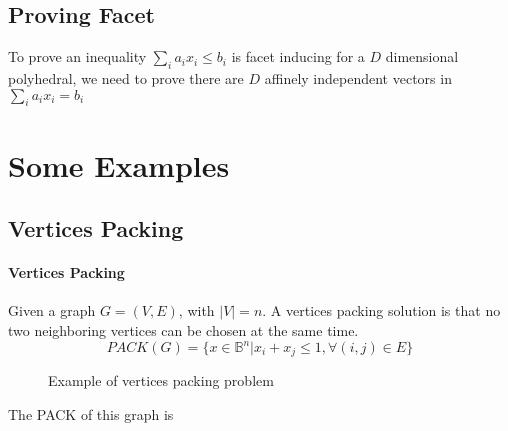             \subsection{Proving Facet}
                To prove an inequality $\sum_i a_i x_i \le b_i$ is facet inducing for a $D$ dimensional polyhedral, we need to prove there are $D$ affinely independent vectors in $\sum_i a_i x_i = b_i$

        \section{Some Examples}
            \subsection{Vertices Packing}
                \paragraph{Vertices Packing}
                    Given a graph $G=(V, E)$, with $|V|=n$. A vertices packing solution is that no two neighboring vertices can be chosen at the same time.
                    \begin{equation*}
                        PACK(G) = \{x\in \mathbb{B}^n|x_i + x_j \le 1, \forall (i, j)\in E\} \nonumber
                    \end{equation*}

                    \begin{figure}[!ht]
                        \centering
                        \caption{Example of vertices packing problem}
                    \end{figure}

                    The PACK of this graph is

